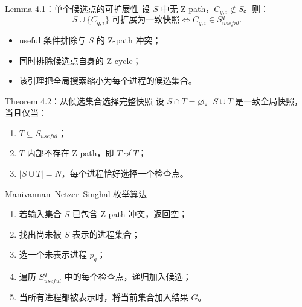 \documentclass[UTF8,fontset=none,aspectratio=169,10pt]{beamer}
\begin{document}
\begin{frame}{Lemma 4.1：单个候选点的可扩展性}
设 $S$ 中无 Z-path，$C_{q,i}\notin S$。则：
\[
S\cup\{C_{q,i}\}\text{ 可扩展为一致快照}
\Longleftrightarrow
C_{q,i}\in S_{useful}^q.
\]
\begin{itemize}
  \item useful 条件排除与 $S$ 的 Z-path 冲突；
  \item 同时排除候选点自身的 Z-cycle；
  \item 该引理把全局搜索缩小为每个进程的候选集合。
\end{itemize}
\end{frame}

\begin{frame}{Theorem 4.2：从候选集合选择完整快照}
设 $S\cap T=\varnothing$。$S\cup T$ 是一致全局快照，当且仅当：
\begin{enumerate}
  \item $T\subseteq S_{useful}$；
  \item $T$ 内部不存在 Z-path，即 $T\not\leadsto T$；
  \item $|S\cup T|=N$，每个进程恰好选择一个检查点。
\end{enumerate}
\vfill
{}
\end{frame}

\begin{frame}{Manivannan--Netzer--Singhal 枚举算法}
\begin{enumerate}
  \item 若输入集合 $S$ 已包含 Z-path 冲突，返回空；
  \item 找出尚未被 $S$ 表示的进程集合；
  \item 选一个未表示进程 $p_q$；
  \item 遍历 $S_{useful}^q$ 中的每个检查点，递归加入候选；
  \item 当所有进程都被表示时，将当前集合加入结果 $G$。
\end{enumerate}
\vfill
{}
\end{frame}
\end{document}
